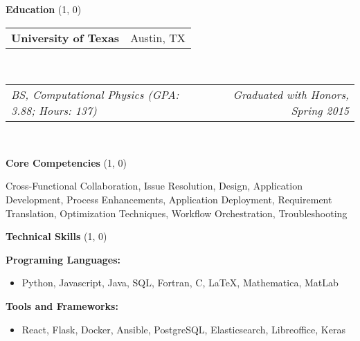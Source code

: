 \documentclass{article}
\makeatletter
\newcommand{\heading}[1]{
	\vspace{2em}
	\textbf{\large #1}
	\line(1, 0){\textwidth}
	\vspace{-0.5em}
}
\newcommand{\subheading}[2]{
	\begin{tabular*}{\textwidth}{l@{\extracolsep{\fill}}r}
		\textbf{#1} & #2 \\
	\end{tabular*} \\
}
\newcommand{\itemheading}[2]{
	\vspace{0.2em}
	\begin{tabular*}{\textwidth}{l@{\extracolsep{\fill}}r}
		\textit{#1} & \textit{#2} \\
	\end{tabular*} \\
	\vspace{-0.5em}
}
\makeatother
\begin{document}
\heading{Education}

\subheading{University of Texas}{Austin, TX}
\itemheading{BS, Computational Physics (GPA: 3.88; Hours: 137)}{Graduated with Honors, Spring 2015}

\heading{Core Competencies}

Cross-Functional Collaboration, Issue Resolution, Design, Application Development, Process Enhancements,
Application Deployment, Requirement Translation, Optimization Techniques, Workflow Orchestration,
Troubleshooting

\heading{Technical Skills}

\textbf{Programing Languages:}
\begin{itemize}
	\item[] Python, Javascript, Java, SQL, Fortran, C, \LaTeX, Mathematica, MatLab
\end{itemize}

\textbf{Tools and Frameworks:}
\begin{itemize}
	\item[] React, Flask, Docker, Ansible, PostgreSQL, Elasticsearch, Libreoffice, Keras
\end{itemize}
\end{document}
